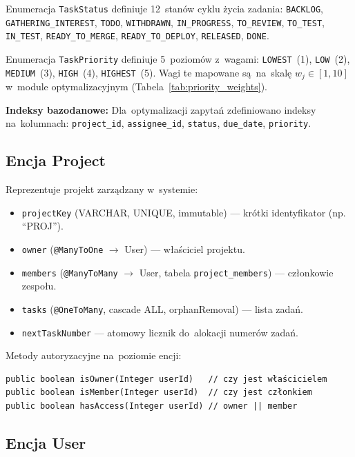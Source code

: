 Enumeracja \texttt{TaskStatus} definiuje 12~stanów cyklu życia zadania: \texttt{BACKLOG}, \texttt{GATHERING\_INTEREST}, \texttt{TODO}, \texttt{WITHDRAWN}, \texttt{IN\_PROGRESS}, \texttt{TO\_REVIEW}, \texttt{TO\_TEST}, \texttt{IN\_TEST}, \texttt{READY\_TO\_MERGE}, \texttt{READY\_TO\_DEPLOY}, \texttt{RELEASED}, \texttt{DONE}.

Enumeracja \texttt{TaskPriority} definiuje 5~poziomów z~wagami: \texttt{LOWEST}~(1), \texttt{LOW}~(2), \texttt{MEDIUM}~(3), \texttt{HIGH}~(4), \texttt{HIGHEST}~(5). Wagi te mapowane są~na~skalę $w_j \in [1,10]$ w~module optymalizacyjnym (Tabela~\ref{tab:priority_weights}).

\textbf{Indeksy bazodanowe:} Dla~optymalizacji zapytań zdefiniowano indeksy na~kolumnach: \texttt{project\_id}, \texttt{assignee\_id}, \texttt{status}, \texttt{due\_date}, \texttt{priority}.

\subsection{Encja Project}

Reprezentuje projekt zarządzany w~systemie:

\begin{itemize}
    \item \texttt{projectKey} (VARCHAR, UNIQUE, immutable) --- krótki identyfikator (np. ``PROJ'').
    \item \texttt{owner} (\texttt{@ManyToOne} $\rightarrow$ User) --- właściciel projektu.
    \item \texttt{members} (\texttt{@ManyToMany} $\rightarrow$ User, tabela \texttt{project\_members}) --- członkowie zespołu.
    \item \texttt{tasks} (\texttt{@OneToMany}, cascade ALL, orphanRemoval) --- lista zadań.
    \item \texttt{nextTaskNumber} --- atomowy licznik do~alokacji numerów zadań.
\end{itemize}

Metody autoryzacyjne na~poziomie encji:

\begin{verbatim}
public boolean isOwner(Integer userId)   // czy jest właścicielem
public boolean isMember(Integer userId)  // czy jest członkiem
public boolean hasAccess(Integer userId) // owner || member
\end{verbatim}

\subsection{Encja User}

